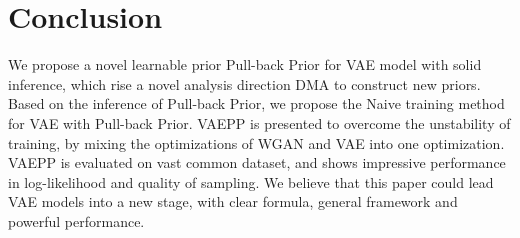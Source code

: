 \section{Conclusion}

We propose a novel learnable prior Pull-back Prior for VAE model with solid inference, which rise a novel analysis direction DMA to construct new priors. Based on the inference of Pull-back Prior, we propose the Naive training method for VAE with Pull-back Prior. VAEPP is presented to overcome the unstability of training, by mixing the optimizations of WGAN and VAE into one optimization. VAEPP is evaluated on vast common dataset, and shows impressive performance in log-likelihood and quality of sampling. We believe that this paper could lead VAE models into a new stage, with clear formula, general framework and powerful performance. 